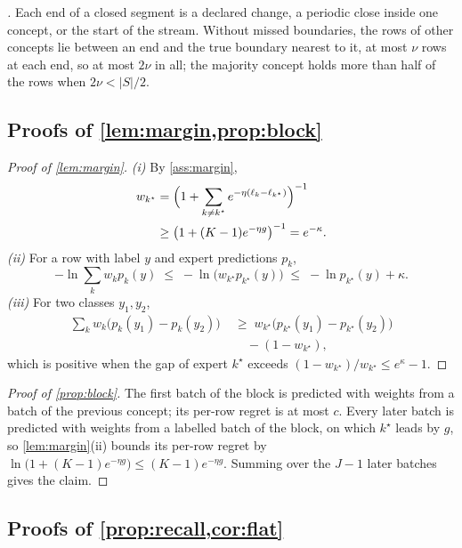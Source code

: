 \documentclass[11pt]{article}
\theoremstyle{plain}
\theoremstyle{definition}
\theoremstyle{remark}
\begin{document}
\emph{.} Each end of a closed segment is a declared change, a periodic close inside one concept, or
the start of the stream. Without missed boundaries, the rows of other concepts lie between an end and the true
boundary nearest to it, at most $\nu$ rows at each end, so at most $2\nu$ in all; the majority concept holds more
than half of the rows when $2\nu<|S|/2$.

\subsection{Proofs of \texorpdfstring{\cref{lem:margin,prop:block}}{Lemma 1 and Proposition 4}}

\begin{proof}[Proof of \cref{lem:margin}]
\emph{(i)} By \cref{ass:margin},
\begin{align*}
  w_{k^\star}&=\Bigl(1+\sum_{k\ne k^\star}e^{-\eta(\ell_k-\ell_{k^\star})}\Bigr)^{-1}\\
  &\ge\bigl(1+(K-1)e^{-\eta g}\bigr)^{-1}=e^{-\kappa}.
\end{align*}
\emph{(ii)} For a row with label $y$ and expert predictions $p_k$,
\[
  -\ln\sum_kw_kp_k(y)\;\le\;-\ln\bigl(w_{k^\star}p_{k^\star}(y)\bigr)\;\le\;-\ln p_{k^\star}(y)+\kappa .
\]
\emph{(iii)} For two classes $y_1,y_2$,
\begin{align*}
  \sum_kw_k\bigl(p_k(y_1)-p_k(y_2)\bigr)\;&\ge\;w_{k^\star}\bigl(p_{k^\star}(y_1)-p_{k^\star}(y_2)\bigr)\\
  &\quad-(1-w_{k^\star}),
\end{align*}
which is positive when the gap of expert $k^\star$ exceeds $(1-w_{k^\star})/w_{k^\star}\le e^{\kappa}-1$.
\end{proof}

\begin{proof}[Proof of \cref{prop:block}]
The first batch of the block is predicted with weights from a batch of the previous concept; its per-row regret is
at most $c$. Every later batch is predicted with weights from a labelled batch of the block, on which $k^\star$
leads by $g$, so \cref{lem:margin}(ii) bounds its per-row regret by
$\ln\bigl(1+(K-1)e^{-\eta g}\bigr)\le(K-1)e^{-\eta g}$. Summing over the $J-1$ later batches gives the claim.
\end{proof}

\subsection{Proofs of \texorpdfstring{\cref{prop:recall,cor:flat}}{Theorem 1 and Corollary 2}}
\end{document}
